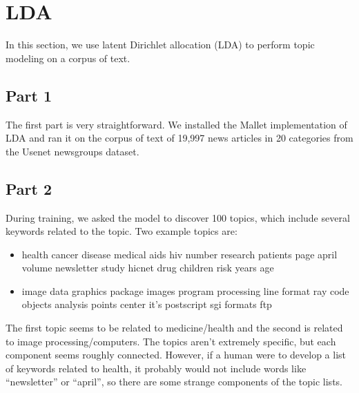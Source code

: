\section{LDA} \label{sec:prob3}
In this section, we use latent Dirichlet allocation (LDA) to perform topic modeling on a corpus of text.

\subsection{Part 1}
The first part is very straightforward.
We installed the Mallet implementation of LDA and ran it on the corpus of text of 19,997 news articles in 20 categories from the Usenet newsgroups dataset.

\subsection{Part 2}
During training, we asked the model to discover 100 topics, which include several keywords related to the topic.
Two example topics are:
\begin{itemize}
	\item health cancer disease medical aids hiv number research patients page april volume newsletter study hicnet drug children risk years age 
	\item image data graphics package images program processing line format ray code objects analysis points center it's postscript sgi formats ftp
\end{itemize}
The first topic seems to be related to medicine/health and the second is related to image processing/computers.
The topics aren't extremely specific, but each component seems roughly connected.
However, if a human were to develop a list of keywords related to health, it probably would not include words like ``newsletter'' or ``april'', so there are some strange components of the topic lists.

